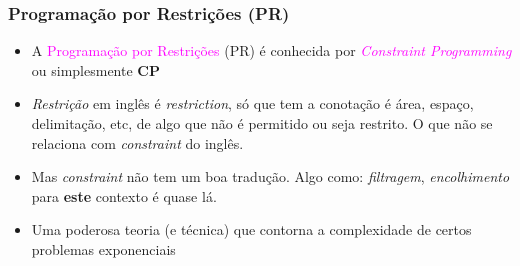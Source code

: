 \documentclass{beamer}
\begin{document}
\begin{frame}[fragile]

 \frametitle{Programação por Restrições (PR)}

   \begin{block}{}
     \begin{itemize}
     
      \item A \textcolor{magenta}{Programação por Restrições} (PR) é conhecida por \textcolor{magenta}{\textit{Constraint Programming}} 
      ou simplesmente \textbf{CP}
      
      \item {\em Restrição} em inglês é {\em restriction}, só que tem  a conotação é área, espaço, delimitação, etc, de algo que não é permitido ou seja restrito. O que não se relaciona com {\em constraint} do inglês.
      
      \item Mas {\em constraint}  não tem um boa tradução. Algo como: {\em filtragem}, {\em encolhimento} para {\bf este} contexto é quase lá.

      \pause
      \item Uma poderosa teoria (e técnica)  que  contorna a complexidade de certos problemas exponenciais
      
             
    \end{itemize}
    
    \end{block}
    
\end{frame}
\end{document}
